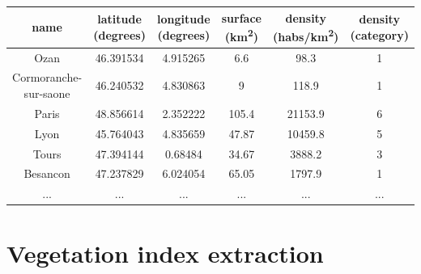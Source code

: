 \documentclass[c]{beamer}
\begin{document}
\begin{frame}
\begin{table}
\begin{center}
\begin{adjustbox}{max width=\textwidth}
{\tiny
\begin{tabular}{|c|c|c|c|c|c|}
\hline 
name & latitude (degrees) & longitude (degrees) & surface (km\textsuperscript{2}) & density (habs/km\textsuperscript{2}) & density (category)\\
\hline
Ozan & 46.391534 & 4.915265 & 6.6 & 98.3 & 1\\
\hline 
Cormoranche-sur-saone & 46.240532 & 4.830863 & 9 & 118.9 & 1\\
\hline 
Paris & 48.856614 & 2.352222 & 105.4 & 21153.9 & 6\\
\hline
Lyon & 45.764043 & 4.835659 & 47.87 & 10459.8 & 5\\
\hline
Tours & 47.394144 & 0.68484 & 34.67 & 3888.2 & 3\\
\hline
Besancon & 47.237829 & 6.024054 & 65.05 & 1797.9 & 1\\
\hline 
... & ... & ... & ... & ... & ...\\
\hline
\end{tabular}
}
\end{adjustbox}
\end{center}
\end{table}

\end{frame}

\section{Vegetation index extraction}
\end{document}
